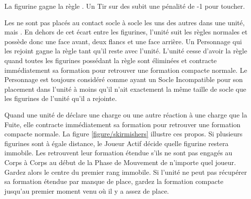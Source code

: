 
La figurine gagne la règle \newfromWHB{\lighttroops}. Un Tir sur des \skirmishers{} subit une pénalité de -1 pour toucher.

Les \skirmishers{} ne sont pas placés au contact socle à socle les uns des autres dans une unité, mais . En dehors de cet écart entre les figurines, l'unité suit les règles normales et possède donc une face avant, deux flancs et une face arrière.  Un Personnage qui les rejoint gagne la règle \skirmisher{} tant qu'il reste avec l'unité. L'unité cesse d'avoir la règle \skirmisher{} quand toutes les figurines possédant la règle sont éliminées et contracte immédiatement sa formation pour retrouver une formation compacte normale. Le Personnage est toujours considéré comme ayant un Socle Incompatible pour son placement dans l'unité à moins qu'il n'ait exactement la même taille de socle que les figurines de l'unité qu'il a rejointe.

Quand une unité de \skirmishers{} déclare une charge ou une autre réaction à une charge que la Fuite, elle contracte immédiatement sa formation pour retrouver une formation compacte normale.  La figure \ref{figure/skirmishers} illustre ces propos. Si plusieurs figurines sont à égale distance, le Joueur Actif décide quelle figurine restera immobile. Les \skirmishers{} retrouvent leur formation étendue s'ils ne sont pas engagés au Corps à Corps au début de la Phase de Mouvement de n'importe quel joueur. Gardez alors le centre du premier rang immobile. Si l'unité ne peut pas récupérer sa formation étendue par manque de place, gardez la formation compacte jusqu'au premier moment venu où il y a assez de place.

\newcommand{\figSkirmiA}{a)}
\newcommand{\figSkirmiB}{b)}
\newcommand{\figSkirmiC}{c)}
\newcommand{\figSkirmiD}{d)}
\newcommand{\figSkirmiDist}{\smallfontsize 0,5\distance{}}
\newcommand{\figSkirmiCharge}{\textit{Charge !}}
\newcommand{\figSkirmiStandAndShoot}{\textit{Tenez la Position et Tirez !}}
\newcommand{\figSkirmiHold}{\textit{Tenez la Position !}}

